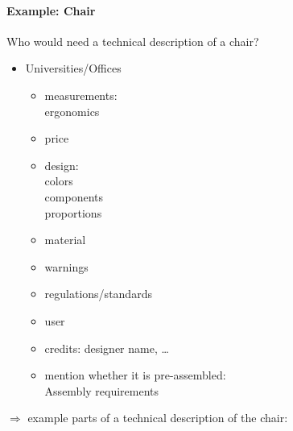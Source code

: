\documentclass{scrreprt}
\begin{document}
\paragraph{Example: Chair}
Who would need a technical description of a chair?
\begin{itemize}
\item Universities/Offices
\begin{itemize}
\item measurements:\\
ergonomics
\item price
\item design:\\
colors\\
components\\
proportions
\item material
\item warnings
\item regulations/standards
\item user
\item credits: designer name, …
\item mention whether it is pre-assembled:\\
Assembly requirements
\end{itemize}
\end{itemize}
$\Rightarrow$ example parts of a technical description of the chair:
\end{document}
